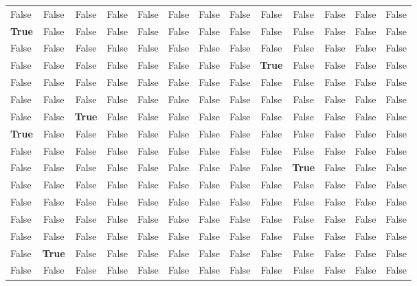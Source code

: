 \documentclass{classrep}
\begin{document}
\begin{table}[H]
{\begin{tabular}{@{}lcccccccccccc@{}}
False  &  False  &  False  &  False  &  False  &  False  &  False  &  False  &  False  &  False  &  False  &  False  &  False\\
\textbf{True}  &  False  &  False  &  False  &  False  &  False  &  False  &  False  &  False  &  False  &  False  &  False  &  False\\
False  &  False  &  False  &  False  &  False  &  False  &  False  &  False  &  False  &  False  &  False  &  False  &  False\\
False  &  False  &  False  &  False  &  False  &  False  &  False  &  False  &   \textbf{True}  &  False  &  False  &  False  &  False\\
False  &  False  &  False  &  False  &  False  &  False  &  False  &  False  &  False  &  False  &  False  &  False  &  False\\
False  &  False  &  False  &  False  &  False  &  False  &  False  &  False  &  False  &  False  &  False  &  False  &  False\\
False  &  False  &   \textbf{True}  &  False  &  False  &  False  &  False  &  False  &  False  &  False  &  False  &  False  &  False\\
\textbf{True}  &  False  &  False  &  False  &  False  &  False  &  False  &  False  &  False  &  False  &  False  &  False  &  False\\
False  &  False  &  False  &  False  &  False  &  False  &  False  &  False  &  False  &  False  &  False  &  False  &  False\\
False  &  False  &  False  &  False  &  False  &  False  &  False  &  False  &  False  &   \textbf{True}  &  False  &  False  &  False\\
False  &  False  &  False  &  False  &  False  &  False  &  False  &  False  &  False  &  False  &  False  &  False  &  False\\
False  &  False  &  False  &  False  &  False  &  False  &  False  &  False  &  False  &  False  &  False  &  False  &  False\\
False  &  False  &  False  &  False  &  False  &  False  &  False  &  False  &  False  &  False  &  False  &  False  &  False\\
False  &  False  &  False  &  False  &  False  &  False  &  False  &  False  &  False  &  False  &  False  &  False  &  False\\
False  &   \textbf{True}  &  False  &  False  &  False  &  False  &  False  &  False  &  False  &  False  &  False  &  False  &  False\\
False  &  False  &  False  &  False  &  False  &  False  &  False  &  False  &  False  &  False  &  False  &  False  &  False\\

\end{tabular}}
\end{table}
\end{document}
